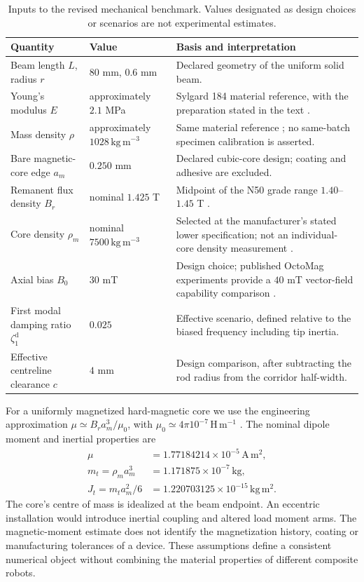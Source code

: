 \begin{table}[t]
\centering\small
\caption{Inputs to the revised mechanical benchmark. Values designated as
design choices or scenarios are not experimental estimates.}
\label{mech:parameters}
\setlength{\tabcolsep}{5pt}
\begin{tabular}{p{}p{}p{}}
\toprule
Quantity & Value & Basis and interpretation\\
\midrule
Beam length $L$, radius $r$ & $80$ mm, $0.6$ mm & Declared geometry of the uniform solid beam.\\
Young's modulus $E$ & approximately $2.1$ MPa & Sylgard 184 material reference, with the preparation stated in the text \citep{cho2021pdms}.\\
Mass density $\rho$ & approximately $1028\,\mathrm{kg\,m^{-3}}$ & Same material reference \citep{cho2021pdms}; no same-batch specimen calibration is asserted.\\
Bare magnetic-core edge $a_m$ & $0.250$ mm & Declared cubic-core design; coating and adhesive are excluded.\\
Remanent flux density $B_r$ & nominal $1.425$ T & Midpoint of the N50 grade range $1.40$--$1.45$ T \citep{smN50}.\\
Core density $\rho_m$ & nominal $7500\,\mathrm{kg\,m^{-3}}$ & Selected at the manufacturer's stated lower specification; not an individual-core density measurement \citep{smN50}.\\
Axial bias $B_0$ & $30$ mT & Design choice; published OctoMag experiments provide a $40$ mT vector-field capability comparison \citep{lussi2021cvs}.\\
First modal damping ratio $\zeta_1^{\mathrm{d}}$ & $0.025$ & Effective scenario, defined relative to the biased frequency including tip inertia.\\
Effective centreline clearance $c$ & $4$ mm & Design comparison, after subtracting the rod radius from the corridor half-width.\\
\bottomrule
\end{tabular}
\end{table}

For a uniformly magnetized hard-magnetic core we use the engineering
approximation $\mu\simeq B_ra_m^3/\mu_0$, with
$\mu_0\simeq4\pi10^{-7}\,\mathrm{H\,m^{-1}}$ \citep{kjMoment}.
The nominal dipole moment and inertial properties are
\begin{align}
 \mu&=1.77184214\times10^{-5}\,\mathrm{A\,m^2},\nonumber\\
 m_t=\rho_ma_m^3&=1.171875\times10^{-7}\,\mathrm{kg},\nonumber\\
 J_t=m_ta_m^2/6&=1.220703125\times10^{-15}\,\mathrm{kg\,m^2}.
 \label{mech:core-properties}
\end{align}
The core's centre of mass is idealized at the beam endpoint. An
eccentric installation would introduce inertial coupling and altered
load moment arms. The magnetic-moment estimate does not identify the
magnetization history, coating or manufacturing tolerances of a device.
These assumptions define a consistent numerical object without
combining the material properties of different composite robots.

